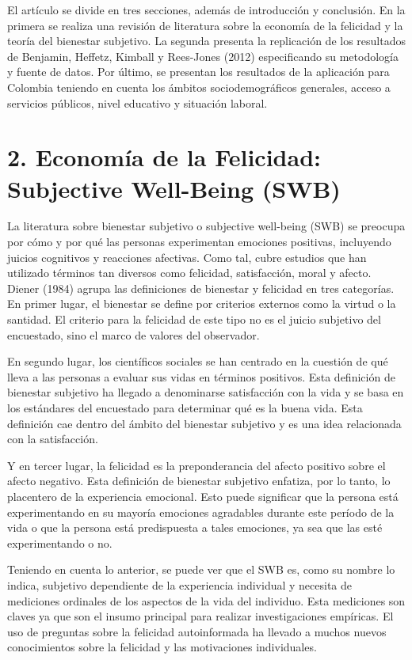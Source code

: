 \documentclass[12pt,spanish]{article}
\begin{document}
El artículo se divide en tres secciones, además de introducción y conclusión. En la primera se realiza una revisión de literatura sobre la economía de la felicidad y la teoría del bienestar subjetivo. La segunda presenta la replicación de los resultados de Benjamin, Heffetz, Kimball y Rees-Jones (2012) especificando su metodología y fuente de datos. Por último, se presentan los resultados de la aplicación para Colombia teniendo en cuenta los ámbitos sociodemográficos generales, acceso a servicios públicos, nivel educativo y situación laboral. 

\section*{2. Economía de la Felicidad: Subjective Well-Being (SWB)}

La literatura sobre bienestar subjetivo o subjective well-being (SWB) se preocupa por cómo y por qué las personas experimentan emociones positivas, incluyendo  juicios cognitivos y reacciones afectivas. Como tal, cubre estudios que han utilizado términos tan diversos como felicidad, satisfacción, moral y afecto. Diener (1984) agrupa las definiciones de bienestar y felicidad en tres categorías. En primer lugar, el bienestar se define por criterios externos como la virtud o la santidad. El criterio para la felicidad de este tipo no es el juicio subjetivo del encuestado, sino el marco de valores del observador. 

En segundo lugar, los científicos sociales se han centrado en la cuestión de qué lleva a las personas a evaluar sus vidas en términos positivos. Esta definición de bienestar subjetivo ha llegado a denominarse satisfacción con la vida y se basa en los estándares del encuestado para determinar qué es la buena vida. Esta definición cae dentro del ámbito del bienestar subjetivo y es una idea relacionada con la satisfacción.

Y en tercer lugar, la felicidad es la preponderancia del afecto positivo sobre el afecto negativo. Esta definición de bienestar subjetivo enfatiza, por lo tanto, lo placentero de la experiencia emocional. Esto puede significar que la persona está experimentando en su mayoría emociones agradables durante este período de la vida o que la persona está predispuesta a tales emociones, ya sea que las esté experimentando o no.

Teniendo en cuenta lo anterior, se puede ver que el SWB es, como su nombre lo indica, subjetivo dependiente de la experiencia individual y necesita de mediciones ordinales de los aspectos de la vida del individuo. Esta mediciones son claves ya que son el insumo principal para realizar investigaciones empíricas. El uso de preguntas sobre la felicidad autoinformada ha llevado a muchos nuevos conocimientos sobre la felicidad y las motivaciones individuales. 
\end{document}
